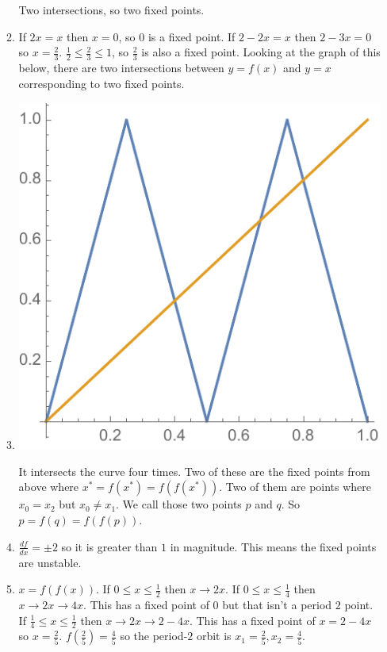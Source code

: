 \documentclass[12pt,letterpaper,noanswers]{exam}
\begin{document}
\begin{enumerate}
\begin{enumerate}
Two intersections, so two fixed points.
\item If $2x = x$ then $ x = 0$, so $0$ is a fixed point.  If $2 -2 x = x$ then $2 - 3x = 0$ so 
$x = \frac{2}{3}$.  $\frac{1}{2}\leq \frac{2}{3}\leq 1$, so $\frac{2}{3}$ is also a fixed point.  Looking at the graph of this below,
there are two intersections between $y=f(x)$ and $y=x$ corresponding to two fixed points.
\item

\includegraphics[scale=0.5]{img/C20map2.pdf}

It intersects the curve four times.  Two of these are the fixed points from above where $x^* = f(x^*) = f(f(x^*))$.  Two of them are points where $x_0 = x_2$ but $x_0 \neq x_1$.  We call those two points $p$ and $q$.  So $p = f(q) = f(f(p))$.
\item $\frac{df}{dx} = \pm 2$ so it is greater than $1$ in magnitude.  This means the fixed points are unstable.
\item $x = f(f(x))$.  If $0\leq x\leq \frac{1}{2}$ then $x \rightarrow 2x$.  If $0\leq x \leq \frac{1}{4}$ then $x \rightarrow 2x \rightarrow 4x$.
This has a fixed point of $0$ but that isn't a period $2$ point.  If $\frac{1}{4} \leq x \leq \frac{1}{2}$ then $x \rightarrow 2x \rightarrow 2 - 4x$.
This has a fixed point of $x = 2 - 4x$ so $x = \frac{2}{5}$.  $f(\frac{2}{5}) = \frac{4}{5}$ so the period-$2$ orbit is 
$x_1=\frac{2}{5}, x_2=\frac{4}{5}.$


\end{enumerate}
\end{enumerate}
\end{document}
